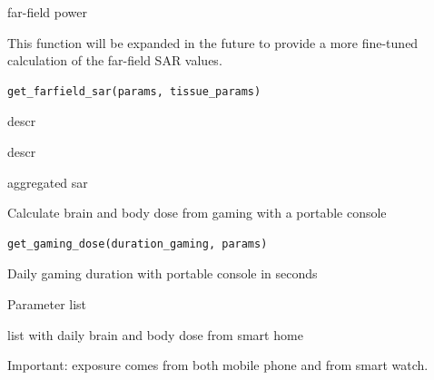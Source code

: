 \documentclass[a4paper]{book}
\begin{document}
%
\begin{Value}
far-field power
\end{Value}
%
\begin{Description}
This function will be expanded in the future to provide a more fine-tuned
calculation of the far-field SAR values.
\end{Description}
%
\begin{Usage}
\begin{verbatim}
get_farfield_sar(params, tissue_params)
\end{verbatim}
\end{Usage}
%
\begin{Arguments}
\begin{ldescription}
\item[\code{params}] descr

\item[\code{tissue\_params}] descr
\end{ldescription}
\end{Arguments}
%
\begin{Value}
aggregated sar
\end{Value}
%
\begin{Description}
Calculate brain and body dose from gaming with a portable console
\end{Description}
%
\begin{Usage}
\begin{verbatim}
get_gaming_dose(duration_gaming, params)
\end{verbatim}
\end{Usage}
%
\begin{Arguments}
\begin{ldescription}
\item[\code{duration\_gaming}] Daily gaming duration with portable console in seconds

\item[\code{params}] Parameter list
\end{ldescription}
\end{Arguments}
%
\begin{Value}
list with daily brain and body dose from smart home
\end{Value}
%
\begin{Description}
Important: exposure comes from both mobile phone and from smart watch.
\end{Description}
\end{document}
